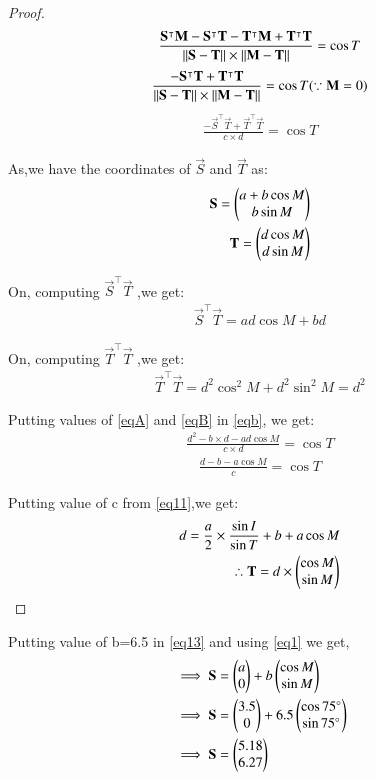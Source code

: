 \documentclass[journal,12pt,twocolumn]{IEEEtran}
\begin{document}
\begin{enumerate}
\begin{proof}
\begin{align}
\frac{\mathbf{S}^\intercal\mathbf{M}-\mathbf{S}^\intercal \mathbf{T}-\mathbf{T}^\intercal\mathbf{M}+\mathbf{T}^\intercal \mathbf{T}}{\Vert\mathbf{S-T}\rVert\times\Vert\mathbf{M-T}\rVert}=\cos T
\end{align}
\begin{align}
\frac{-\mathbf{S}^\intercal \mathbf{T}+\mathbf{T}^\intercal \mathbf{T}}{\Vert\mathbf{S-T}\rVert\times\Vert\mathbf{M-T}\rVert} = \cos T ( \because \mathbf{M}=0) 
\end{align}
\begin{align}
\frac{-\vec{S}^\intercal \vec{T}+\vec{T}^\intercal \vec{T}}{c\times d} =\cos T \label{eqb}
\end{align}
\item As,we have the coordinates of $\vec{S}$ and $\vec{T}$ as:
\begin{align}
    \mathbf{S}=\begin{pmatrix}a+b\cos M\\b\sin M\end{pmatrix}
    \\
    \mathbf{T}=\begin{pmatrix}d\cos M\\d\sin M\end{pmatrix}
\end{align}
\item On, computing $\vec{S}^\intercal \vec{T}$ ,we get:
\begin{align}
\vec{S}^\intercal \vec{T}= ad \cos M + bd \label{eqA}
\end{align}
\item On, computing $\vec{T}^\intercal \vec{T}$ ,we get:
\begin{align}
    \vec{T}^\intercal \vec{T}= d^2\cos^2 M+d^2\sin^2 M=d^2 
    \label{eqB}
\end{align}
\item Putting values of \eqref{eqA} and \eqref{eqB} in \eqref{eqb}, we get:
\begin{align}
\frac{d^2-b\times d-ad\cos M}{c\times d} =\cos T
\end{align}
\begin{align}
\frac{d-b-a\cos M}{c} =\cos T
\end{align}
\item Putting value of c from \eqref{eq11},we get:
\begin{align}
d=\frac{a}{2}\times\frac{\sin I}{\sin T}+ b+a \cos M    \label{eqa}
\\
\therefore \mathbf{T}=d \times{\ensuremath{\begin{pmatrix}\cos M\\ \sin M\end{pmatrix}}}
\end{align}
\end{proof}
\item Putting value of b=6.5 in \eqref{eq13} and using \eqref{eq1} we get,
\begin{align}
&\implies \mathbf{S}=\begin{pmatrix}a\\0\end{pmatrix} +b\begin{pmatrix}\cos M \\\sin M\end{pmatrix}
\\
&\implies \mathbf{S}=\begin{pmatrix}3.5\\0\end{pmatrix} +6.5\begin{pmatrix}\cos 75 \degree\\\sin 75 \degree\end{pmatrix} 
\\
&\implies \mathbf{S}=\begin{pmatrix}5.18\\6.27\end{pmatrix}
\end{align}


\end{enumerate}
\end{document}
